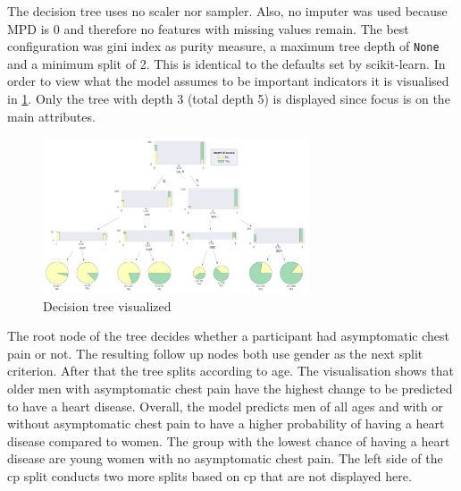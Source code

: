 The decision tree uses no scaler nor sampler. Also, no imputer was used because MPD is 0 and therefore no features with missing values remain. The best configuration was gini index as purity measure, a maximum tree depth of \texttt{None} and a minimum split of 2. This is identical to the defaults set by scikit-learn. 
In order to view what the model assumes to be important indicators it is visualised in \cref{fig:DecisionTree}. Only  the tree with depth 3 (total depth 5) is displayed since focus is on the main attributes. 
\begin{figure}[h]
	\centering
	\includegraphics[width=0.7\textwidth]{images/DecisionTree.png}
	\caption{Decision tree visualized}
	\label{fig:DecisionTree}
\end{figure}

The root node of the tree decides whether a participant had asymptomatic chest pain or not. The resulting follow up nodes both use gender as the next split criterion. After that the tree splits according to age. The visualisation shows that older men with asymptomatic chest pain have the highest change to be predicted to have a heart disease. Overall, the model predicts men of all ages and with or without asymptomatic chest pain to have a higher probability of having a heart disease compared to women. The group with the lowest chance of having a heart disease are young women with no asymptomatic chest pain. The left side of the cp split conducts two more splits based on cp that are not displayed here. 